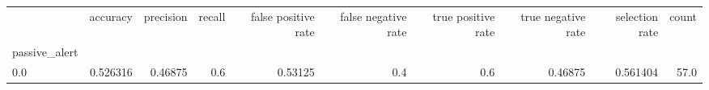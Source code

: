 \begin{tabular}{lrrrrrrrrr}
\toprule
{} &  accuracy &  precision &  recall &  false positive rate &  false negative rate &  true positive rate &  true negative rate &  selection rate &  count \\
passive\_alert &           &            &         &                      &                      &                     &                     &                 &        \\
\midrule
0.0           &  0.526316 &    0.46875 &     0.6 &              0.53125 &                  0.4 &                 0.6 &             0.46875 &        0.561404 &   57.0 \\
\bottomrule
\end{tabular}
